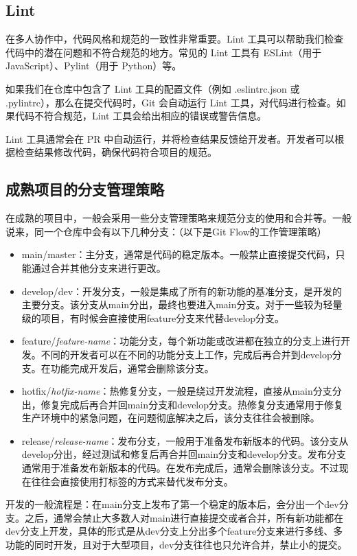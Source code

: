 \subsection{Lint}

在多人协作中，代码风格和规范的一致性非常重要。Lint 工具可以帮助我们检查代码中的潜在问题和不符合规范的地方。常见的 Lint 工具有 ESLint（用于 JavaScript）、Pylint（用于 Python）等。

如果我们在仓库中包含了 Lint 工具的配置文件（例如 .eslintrc.json 或 .pylintrc），那么在提交代码时，Git 会自动运行 Lint 工具，对代码进行检查。如果代码不符合规范，Lint 工具会给出相应的错误或警告信息。

Lint 工具通常会在 PR 中自动运行，并将检查结果反馈给开发者。开发者可以根据检查结果修改代码，确保代码符合项目的规范。

\subsection{成熟项目的分支管理策略}

在成熟的项目中，一般会采用一些分支管理策略来规范分支的使用和合并等。一般说来，同一个仓库中会有以下几种分支：（以下是Git Flow的工作管理策略）
\begin{itemize}
  \item main/master：主分支，通常是代码的稳定版本。一般禁止直接提交代码，只能通过合并其他分支来进行更改。
  \item develop/dev：开发分支，一般是集成了所有的新功能的基准分支，是开发的主要分支。该分支从main分出，最终也要进入main分支。对于一些较为轻量级的项目，有时候会直接使用feature分支来代替develop分支。
  \item feature/\textit{feature-name}：功能分支，每个新功能或改进都在独立的分支上进行开发。不同的开发者可以在不同的功能分支上工作，完成后再合并到develop分支。在功能完成开发后，通常会删除该分支。
  \item hotfix/\textit{hotfix-name}：热修复分支，一般是绕过开发流程，直接从main分支分出，修复完成后再合并回main分支和develop分支。热修复分支通常用于修复生产环境中的紧急问题，在问题彻底解决之后，该分支往往会被删除。
  \item release/\textit{release-name}：发布分支，一般用于准备发布新版本的代码。该分支从develop分出，经过测试和修复后再合并回main分支和develop分支。发布分支通常用于准备发布新版本的代码。在发布完成后，通常会删除该分支。不过现在往往会直接使用打标签的方式来替代发布分支。
\end{itemize}

开发的一般流程是：在main分支上发布了第一个稳定的版本后，会分出一个dev分支。之后，通常会禁止大多数人对main进行直接提交或者合并，所有新功能都在dev分支上开发，具体的形式是从dev分支上分出多个feature分支来进行多线、多功能的同时开发，且对于大型项目，dev分支往往也只允许合并，禁止小的提交。


